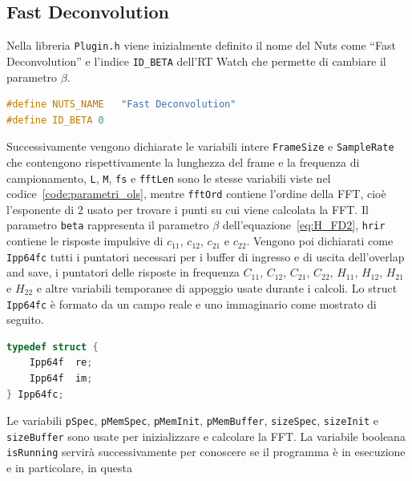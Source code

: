 \documentclass[12pt,a4paper,titlepage]{article}
\begin{document}
\subsection{Fast Deconvolution}
\label{subsec:codice_c_fd}
Nella libreria \texttt{Plugin.h} viene inizialmente definito il nome del Nuts come ``Fast Deconvolution'' e l'indice \texttt{ID\_BETA} dell'RT Watch che permette di cambiare il parametro $\beta$.

\begin{lstlisting}[language=cpp, label=code:costanti_c, caption = Dichiarazione delle costanti in \texttt{Plugin.h},captionpos = b]
#define NUTS_NAME	"Fast Deconvolution"
#define ID_BETA 0
\end{lstlisting}

Successivamente vengono dichiarate le variabili intere \texttt{FrameSize} e \texttt{SampleRate} che contengono rispettivamente la lunghezza del frame e la frequenza di campionamento, \texttt{L}, \texttt{M}, \texttt{fs} e \texttt{fftLen} sono le stesse variabili viste nel codice~\ref{code:parametri_ols}, mentre \texttt{fftOrd} contiene l'ordine della FFT, cioè l'esponente di 2 usato per trovare i punti su cui viene calcolata la FFT. Il parametro \texttt{beta} rappresenta il parametro $\beta$ dell'equazione~\eqref{eq:H_FD2}, \texttt{hrir} contiene le risposte impulsive di $c_{11}$, $c_{12}$, $c_{21}$ e $c_{22}$. Vengono poi dichiarati come \texttt{Ipp64fc} tutti i puntatori necessari per i buffer di ingresso e di uscita dell'overlap and save, i puntatori delle risposte in frequenza  $C_{11}$, $C_{12}$, $C_{21}$, $C_{22}$, $H_{11}$, $H_{12}$, $H_{21}$ e $H_{22}$ e altre variabili temporanee di appoggio usate durante i calcoli. Lo struct \texttt{Ipp64fc} è formato da un campo reale e uno immaginario come mostrato di seguito.

\begin{lstlisting}[language=cpp, label=code:Ipp64fc, caption = Struct \texttt{Ipp64fc}, captionpos = b]
typedef struct {
    Ipp64f  re;
    Ipp64f  im;
} Ipp64fc;
\end{lstlisting}

Le variabili \texttt{pSpec}, \texttt{pMemSpec}, \texttt{pMemInit}, \texttt{pMemBuffer}, \texttt{sizeSpec}, \texttt{sizeInit} e \texttt{sizeBuffer} sono usate per inizializzare e calcolare la FFT. La variabile booleana \texttt{isRunning} servirà successivamente per conoscere se il programma è in esecuzione e in particolare, in questa 
\end{document}
